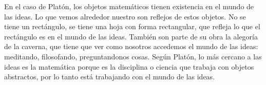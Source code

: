 En el caso de Platón, los objetos matemáticos tienen existencia en el mundo de las ideas. Lo que vemos alrededor nuestro son reflejos de estos objetos. No se tiene un rectángulo, se tiene una hoja con forma rectangular, que refleja lo que el rectángulo es en el mundo de las ideas. También son parte de su obra la alegoría de la caverna, que tiene que ver como nosotros accedemos el mundo de las ideas: meditando, filosofando, preguntandonos cosas. Según Platón, lo más cercano a las ideas es la matemática porque es la disciplina o ciencia que trabaja con objetos abstractos, por lo tanto está trabajando con el mundo de las ideas.